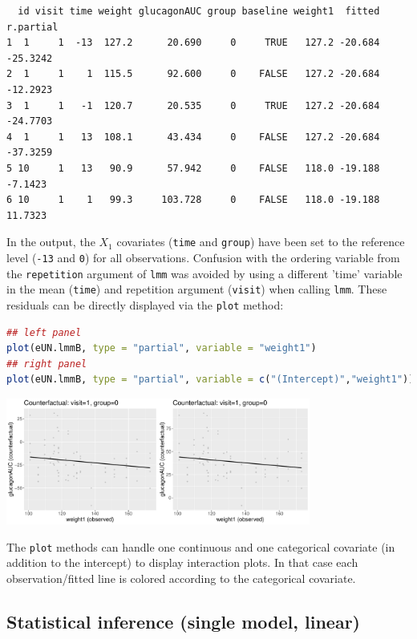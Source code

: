 \documentclass[12pt]{article}
\begin{document}
\label{}
\begin{verbatim}
  id visit time weight glucagonAUC group baseline weight1  fitted r.partial
1  1     1  -13  127.2      20.690     0     TRUE   127.2 -20.684  -25.3242
2  1     1    1  115.5      92.600     0    FALSE   127.2 -20.684  -12.2923
3  1     1   -1  120.7      20.535     0     TRUE   127.2 -20.684  -24.7703
4  1     1   13  108.1      43.434     0    FALSE   127.2 -20.684  -37.3259
5 10     1   13   90.9      57.942     0    FALSE   118.0 -19.188   -7.1423
6 10     1    1   99.3     103.728     0    FALSE   118.0 -19.188   11.7323
\end{verbatim}


In the output, the \(X_1\) covariates (\texttt{time} and \texttt{group}) have been
set to the reference level (\texttt{-13} and \texttt{0}) for all
observations. Confusion with the ordering variable from the
\texttt{repetition} argument of \texttt{lmm} was avoided by using a different 'time'
variable in the mean (\texttt{time}) and repetition argument (\texttt{visit}) when
calling \texttt{lmm}.  These residuals can be directly displayed via the
\texttt{plot} method:
\begin{lstlisting}[language=r,numbers=none]
## left panel
plot(eUN.lmmB, type = "partial", variable = "weight1")
## right panel
plot(eUN.lmmB, type = "partial", variable = c("(Intercept)","weight1"))
\end{lstlisting}

\begin{center}
\includegraphics[width=0.75\textwidth]{./figures/fit-pres.pdf}
\end{center}

The \texttt{plot} methods can handle one continuous and one categorical
covariate (in addition to the intercept) to display interaction
plots. In that case each observation/fitted line is colored according
to the categorical covariate.

\clearpage
\subsection{Statistical inference (single model, linear)}
\label{sec:org2b49dea}
\end{document}
